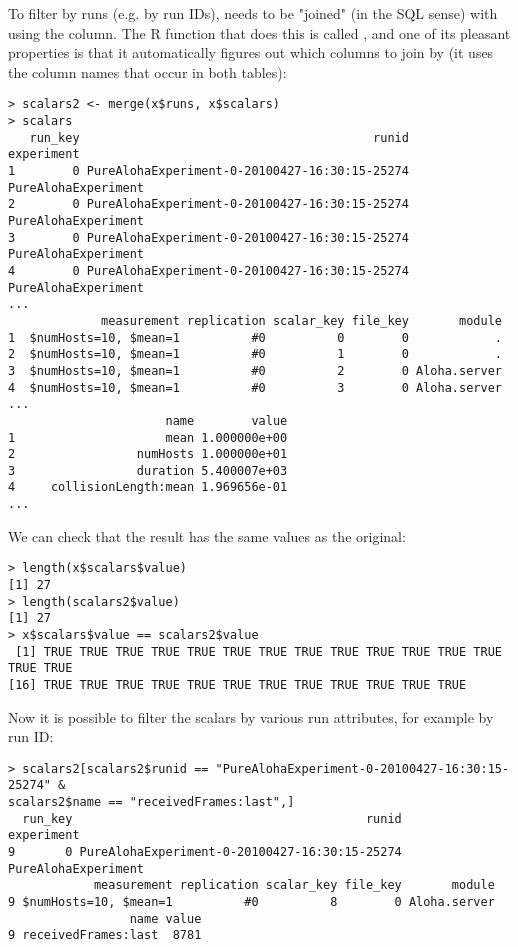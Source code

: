 To filter by runs (e.g. by run IDs),  needs to be "joined" (in the SQL sense)
with  using the  column. The R function that does this
is called , and one of its pleasant properties is that it automatically figures out
which columns to join by (it uses the column names that occur in both tables):

\begin{verbatim}
> scalars2 <- merge(x$runs, x$scalars)
> scalars
   run_key                                         runid          experiment
1        0 PureAlohaExperiment-0-20100427-16:30:15-25274 PureAlohaExperiment
2        0 PureAlohaExperiment-0-20100427-16:30:15-25274 PureAlohaExperiment
3        0 PureAlohaExperiment-0-20100427-16:30:15-25274 PureAlohaExperiment
4        0 PureAlohaExperiment-0-20100427-16:30:15-25274 PureAlohaExperiment
...
             measurement replication scalar_key file_key       module
1  $numHosts=10, $mean=1          #0          0        0            .
2  $numHosts=10, $mean=1          #0          1        0            .
3  $numHosts=10, $mean=1          #0          2        0 Aloha.server
4  $numHosts=10, $mean=1          #0          3        0 Aloha.server
...
                      name        value
1                     mean 1.000000e+00
2                 numHosts 1.000000e+01
3                 duration 5.400007e+03
4     collisionLength:mean 1.969656e-01
...
\end{verbatim}

We can check that the result has the same values as the original:

\begin{verbatim}
> length(x$scalars$value)
[1] 27
> length(scalars2$value)
[1] 27
> x$scalars$value == scalars2$value
 [1] TRUE TRUE TRUE TRUE TRUE TRUE TRUE TRUE TRUE TRUE TRUE TRUE TRUE TRUE TRUE
[16] TRUE TRUE TRUE TRUE TRUE TRUE TRUE TRUE TRUE TRUE TRUE TRUE
\end{verbatim}

Now it is possible to filter the scalars by various run attributes, for example by
run ID:

\begin{verbatim}
> scalars2[scalars2$runid == "PureAlohaExperiment-0-20100427-16:30:15-25274" & 
scalars2$name == "receivedFrames:last",]
  run_key                                         runid          experiment
9       0 PureAlohaExperiment-0-20100427-16:30:15-25274 PureAlohaExperiment
            measurement replication scalar_key file_key       module
9 $numHosts=10, $mean=1          #0          8        0 Aloha.server
                 name value
9 receivedFrames:last  8781
\end{verbatim}


